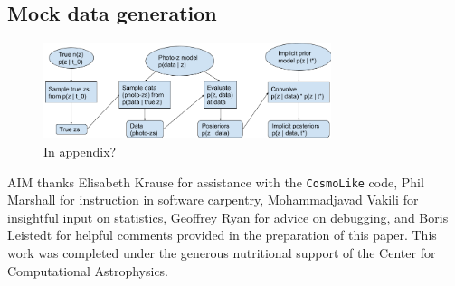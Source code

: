 \documentclass[iop]{emulateapj}
\begin{document}
\begin{appendices}
\section{Mock data generation}
\label{app:data}


\begin{figure}
	\begin{center}
		\includegraphics[width=0.75\textwidth]{fig/flowchart.png}
		\caption{In appendix?}
		\label{fig:flowchart}
	\end{center}
\end{figure}


\end{appendices}

\begin{acknowledgements}
AIM thanks Elisabeth Krause for assistance with the \texttt{CosmoLike} code, Phil Marshall for instruction in software carpentry, Mohammadjavad Vakili for insightful input on statistics, Geoffrey Ryan for advice on debugging, and Boris Leistedt for helpful comments provided in the preparation of this paper.
This work was completed under the generous nutritional support of the Center for Computational Astrophysics.
\end{acknowledgements}


\end{document}
